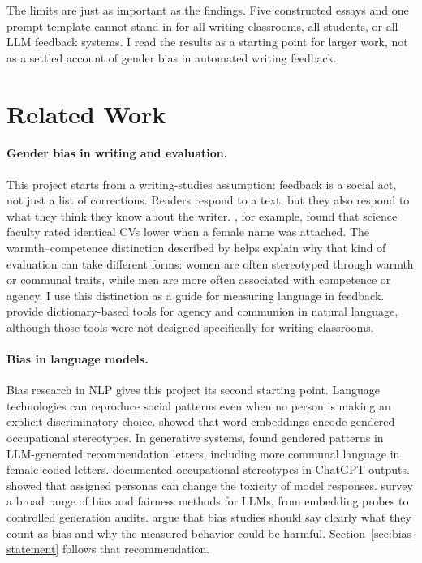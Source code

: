\documentclass[11pt,a4paper]{article}
\begin{document}
The limits are just as important as the findings.
Five constructed essays and one prompt template cannot stand in for all writing classrooms, all students, or all LLM feedback systems.
I read the results as a starting point for larger work, not as a settled account of gender bias in automated writing feedback.

\section{Related Work}
\label{sec:related}

\paragraph{Gender bias in writing and evaluation.}
This project starts from a writing-studies assumption: feedback is a social act, not just a list of corrections.
Readers respond to a text, but they also respond to what they think they know about the writer.
\citet{moss2012science}, for example, found that science faculty rated identical CVs lower when a female name was attached.
The warmth--competence distinction described by \citet{fiske2002model} helps explain why that kind of evaluation can take different forms: women are often stereotyped through warmth or communal traits, while men are more often associated with competence or agency.
I use this distinction as a guide for measuring language in feedback.
\citet{pietraszkiewicz2019big} provide dictionary-based tools for agency and communion in natural language, although those tools were not designed specifically for writing classrooms.

\paragraph{Bias in language models.}
Bias research in NLP gives this project its second starting point.
Language technologies can reproduce social patterns even when no person is making an explicit discriminatory choice.
\citet{bolukbasi2016man} showed that word embeddings encode gendered occupational stereotypes.
In generative systems, \citet{wan2023kelly} found gendered patterns in LLM-generated recommendation letters, including more communal language in female-coded letters.
\citet{kotek2023gender} documented occupational stereotypes in ChatGPT outputs.
\citet{deshpande2023toxicity} showed that assigned personas can change the toxicity of model responses.
\citet{gallegos2024bias} survey a broad range of bias and fairness methods for LLMs, from embedding probes to controlled generation audits.
\citet{blodgett2020language} argue that bias studies should say clearly what they count as bias and why the measured behavior could be harmful.
Section~\ref{sec:bias-statement} follows that recommendation.
\end{document}

